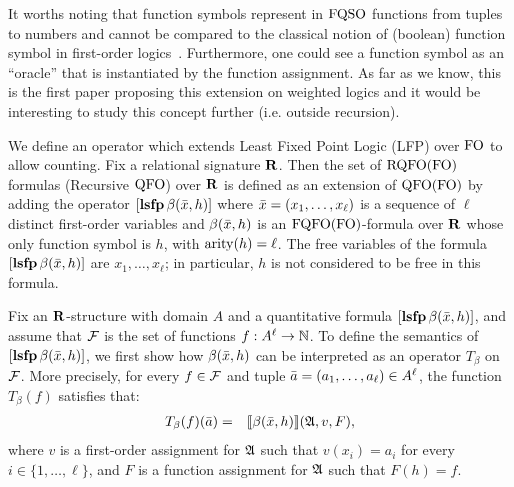 It worths noting that function symbols represent in ${\rm FQSO}$ functions from tuples to numbers and cannot be compared to the classical notion of (boolean) function symbol in first-order logics~\cite{enderton2001mathematical}. 
Furthermore, one could see a function symbol as an ``oracle'' that is instantiated by the function assignment. 
As far as we know, this is the first paper proposing this extension on weighted logics and it would be interesting to study this concept further (i.e. outside recursion).

We define an operator which extends Least Fixed Point Logic (LFP) \cite{I86,vardi1982complexity} over ${\rm FO}$ to allow counting. 
Fix a relational signature $\mathbf{R}$. Then the set of ${\rm RQFO}({\rm FO})$ formulas (Recursive ${\rm QFO}$) over $\mathbf{R}$ is defined as an extension of ${\rm QFO}({\rm FO})$ by adding the operator $[{\bf lsfp} \, \beta(\bar{x}, h)]$ where $\bar{x} = (x_1, \ldots, x_\ell)$ is a sequence of $\ell$ distinct first-order variables and $\beta(\bar{x}, h)$ is an ${\rm FQFO}({\rm FO})$-formula over $\mathbf{R}$ whose only function symbol is $h$, with ${\rm arity}(h) = \ell$. The free variables of the formula $[{\bf lsfp} \, \beta(\bar{x},h)]$ are $x_1, \ldots, x_\ell$; in particular, $h$ is not considered to be free in this formula.

Fix an $\mathbf{R}$-structure with domain $A$ and a quantitative formula $[{\bf lsfp} \, \beta(\bar{x},h)]$, and assume that $\F$ is the set of functions $f :A^\ell \to \mathbb{N}$. To define the semantics of $[{\bf lsfp} \, \beta(\bar{x},h)]$, we first show how $\beta(\bar{x},h)$ can be interpreted as an operator $T_{\beta}$ on $\F$. More precisely, for every $f \in \F$ and tuple $\bar{a} = (a_1, \ldots, a_{\ell}) \in A^\ell$, the function $T_{\beta}(f)$ satisfies that:
\begin{eqnarray*}
T_{\beta}(f)(\bar{a}) & = & {\llbracket{}{\beta(\bar{x}, h)}\rrbracket}(\mathfrak{A},v,F),
\end{eqnarray*}
where $v$ is a first-order assignment  for $\mathfrak{A}$ such that $v(x_i) = a_i$ for every $i \in \{1, \ldots, \ell\}$, and $F$ is a function assignment for $\mathfrak{A}$ such that $F(h) = f$. 

